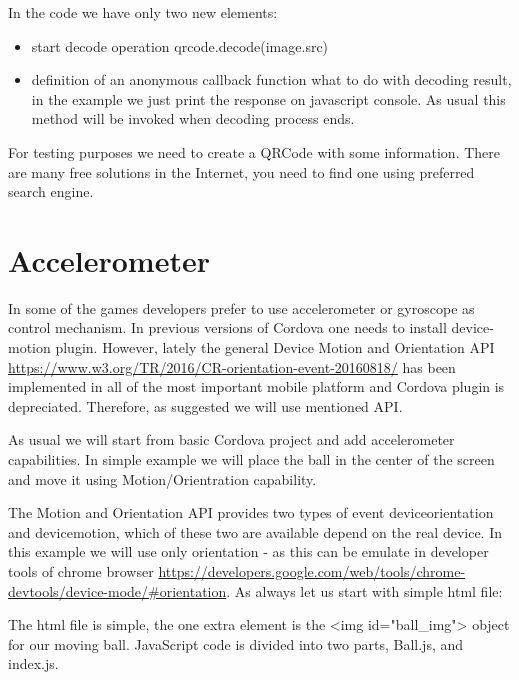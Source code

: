 \begin{explain}
  In the code we have only two new elements:
  \begin{itemize}
  \item start decode operation qrcode.decode(image.src)
  \item definition of an anonymous callback function what to do with decoding result, in the example we just print the response on javascript console. As usual this method will be invoked when decoding process ends.
  \end{itemize}
\end{explain}

\begin{remark}
For testing purposes we need to create a QRCode with some information. There are many free solutions in the Internet, you need to find one using preferred search engine.
\end{remark}

\section{Accelerometer}
In some of the games developers prefer to use accelerometer or gyroscope as control mechanism. In previous versions of Cordova one needs to install device-motion plugin. However, lately the general Device Motion and Orientation API \url{https://www.w3.org/TR/2016/CR-orientation-event-20160818/} has been implemented in all of the most important mobile platform and Cordova plugin is depreciated. Therefore, as suggested we will use mentioned API.

As usual we will start from basic Cordova project and add accelerometer capabilities. In simple example we will place the ball in the center of the screen and move it using Motion/Orientration capability.

The Motion and Orientation API provides two types of event deviceorientation and devicemotion, which of these two are available depend on the real device. In this example we will use only orientation - as this can be emulate in developer tools of chrome browser \url{https://developers.google.com/web/tools/chrome-devtools/device-mode/#orientation}. As always let us start with simple html file:


\begin{explain}
The html file is simple, the one extra element is the <img id="ball\_img"> object for our moving ball. JavaScript code is divided into two parts, Ball.js, and index.js.
\end{explain}


